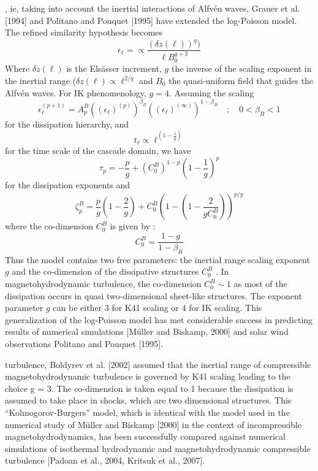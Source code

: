 , ie, taking into account the inertial interactions of Alfvén
waves, Grauer et al. [1994] and Politano and Pouquet [1995] have extended the log-Poisson model. The refined similarity hypothesis becomes 
\begin{equation}
    \epsilon_\ell=\propto\frac{(\delta z(\ell))^g)}{\ell B_0^{g+3}}
\end{equation}
Where $\delta z(\ell)$ is the Elsässer increment, $g$ the inverse of the scaling exponent in the inertial range ($\delta z(\ell)\propto\ell^{2/g}$ and $B_0$ the quasi-uniform field that guides the Alfvén waves. For IK phenomenology, $g=4$. Assuming the scaling
\begin{equation}
    \epsilon_\ell^{(p+1)}=A_p^B((\epsilon_\ell)^{(p)})^{\beta_B}((\epsilon_\ell)^{(\infty)})^{1-\beta_B}\quad;\quad0<\beta_B<1
\end{equation}
for the dissipation hierarchy, and 
\begin{equation}
    t_\ell\propto\ell^{\left(1-\frac{1}{g}\right)}
\end{equation}
for the time scale of the cascade domain, we have
\begin{equation}
    \tau_p=-\frac{p}{g}+(C_0^B)^{1-p}\left(1-\frac{1}{g}\right)^p
\end{equation}
for the dissipation exponents and
\begin{equation}
    \zeta_p^B=\frac{p}{g}\left(1-\frac{2}{g}\right)+C_0^B\left(1-\left(1-\frac{2}{gC_0^B}\right)\right)^{p/g}
\end{equation}
where the co-dimension $C_0^B$ is given by :
\begin{equation}
    C_0^B=\frac{1-g}{1-\beta_B}
\end{equation}
Thus the model contains two free parameters: the inertial range scaling exponent $g$ and the co-dimension of the dissipative structures $C_0^B$ . In magnetohydrodynamic turbulence, the co-dimension $C_0^B \sim 1$ as most of the dissipation occurs in quasi two-dimensional sheet-like structures. The exponent parameter $g$ can be either 3 for K41 scaling or 4 for IK scaling. This generalization of the log-Poisson model has met considerable success in predicting results of numerical simulations [Müller and Biskamp, 2000] and solar wind observations Politano and Pouquet [1995].

 turbulence, Boldyrev et al. [2002] assumed that the inertial range of compressible magnetohydrodynamic turbulence is governed by K41 scaling leading to the choice g = 3. The co-dimension is taken equal to 1 because the dissipation is assumed to take place in shocks, which are two dimensional structures. This “Kolmogorov-Burgers” model, which is identical with the model used in the numerical study of Müller and Biskamp [2000] in the context of incompressible magnetohydrodynamics, has been successfully compared against numerical simulations of isothermal hydrodynamic and magnetohydrodynamic compressible turbulence [Padoan et al., 2004, Kritsuk et al., 2007].

